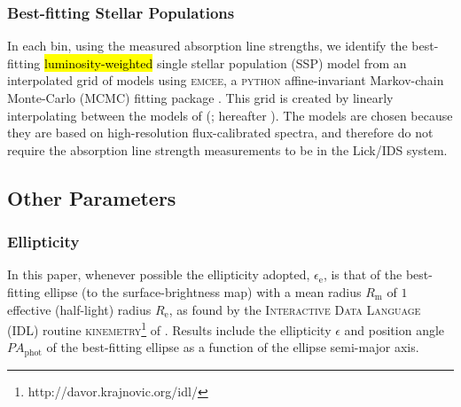 \documentclass[a4paper,fleqn,usenatbib]{mnras}
\DeclareRobustCommand{\added}[1]{{\sethlcolor{green}\hl{#1}}}
\begin{document}
\subsubsection{Best-fitting Stellar Populations}
\label{subsubsec:stellarPop}

In each bin, using the measured absorption line strengths, we identify
the best-fitting \added{luminosity-weighted} single stellar population (SSP) model from an
interpolated grid of models using \textsc{emcee}, a \textsc{python}
affine-invariant Markov-chain Monte-Carlo (MCMC) fitting package
\citep{Foreman-Mackey2013}. This grid is created by linearly
interpolating between the models of \citeauthor{Thomas2010}
(\citeyear{Thomas2010}; hereafter ). The
 models are chosen because they are based on
high-resolution flux-calibrated spectra, and therefore do not require
the absorption line strength measurements to be in the Lick/IDS
system.

\subsection{Other Parameters}
\label{subsec:OtherParameters}

\subsubsection{Ellipticity}
\label{subsubsec:ellip}

In this paper, whenever possible the ellipticity adopted,
$\epsilon_\text{e}$, is that of the best-fitting ellipse (to the
surface-brightness map) with a mean radius $R_\text{m}$ of $1$
effective (half-light) radius $R_\text{e}$,
as found by the \textsc{Interactive Data Language (IDL)} routine
\textsc{kinemetry}\footnote{http://davor.krajnovic.org/idl/} of
\citet{Krajnovic2006}.
Results include the ellipticity $\epsilon$ and position angle
$PA_\text{phot}$ of the best-fitting ellipse as a function of the
ellipse semi-major axis.
\end{document}
